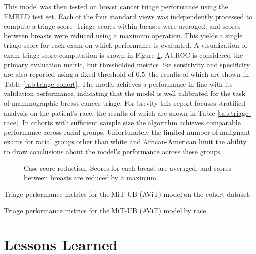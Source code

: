 \documentclass[12pt]{article}
\begin{document}
This model was then tested on breast cancer triage performance using the EMBED test set. Each of the four standard views was independently processed to compute a triage score. Triage scores within breasts were averaged, and scores between breasts were reduced using a maximum operation. This yields a single triage score for each exam on which performance is evaluated.
A visualization of exam triage score computation is shown in Figure \ref{fig:case-score}.
AUROC is considered the primary evaluation metric, but thresholded metrics like sensitivity and specificity are also reported using a fixed threshold of $0.5$, the results of which are shown in Table \ref{tab:triage-cohort}. The model achieves a performance in line with its validation performance, indicating that the model is well calibrated for the task of mammographic breast cancer triage.
For brevity this report focuses stratified analysis on the patient's race, the results of which are shown in Table \ref{tab:triage-race}. In cohorts with sufficient sample size the algorithm achieves comparable performance across racial groups. Unfortunately the limited number of malignant exams for racial groups other than white and African-American limit the ability to draw conclusions about the model's performance across these groups.


\begin{figure}[H]
    \centering
    
    \caption{Case score reduction. Scores for each breast are averaged, and scores between breasts are reduced by a maximum.}
    \label{fig:case-score}
\end{figure}

\begin{table}[H]
    \centering
    
    \caption{Triage performance metrics for the MiT-UB (AViT) model on the cohort dataset.}
    \label{tab:triage-cohort}
\end{table}


\begin{table}[H]
    \centering
    \resizebox{\textwidth}{!}{%
        
    }
    \caption{Triage performance metrics for the MiT-UB (AViT) model by race.}
    \label{tab:triage-race}
\end{table}


\section{Lessons Learned}
\noindent
\end{document}
